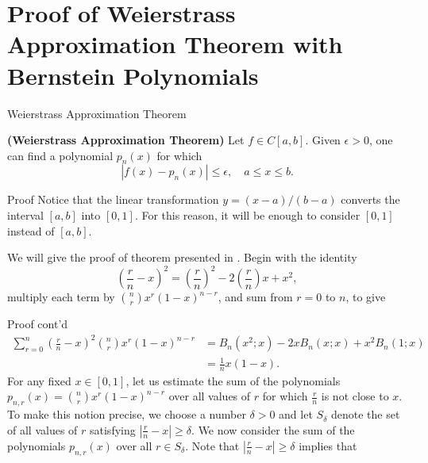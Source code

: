\documentclass{beamer}
\begin{document}
\section{Proof of Weierstrass Approximation Theorem with Bernstein Polynomials}
\begin{frame}{Weierstrass Approximation Theorem}
    \begin{theorem}{\bf (Weierstrass Approximation Theorem)}
    Let $f \in C[a, b]$. Given $\epsilon > 0$, one can find a polynomial $p_n(x)$ for which
\begin{equation}
    |f(x) - p_n(x)| \leq \epsilon, \quad a \leq x \leq b.
    \label{weierstrass}
\end{equation}
\end{theorem}
\end{frame}
\begin{frame}{Proof}
    Notice that the linear transformation $y=(x-a)/(b-a)$ converts the interval $[a,b]$ into $[0,1].$ For this reason, it will be enough to consider $[0,1]$ instead of $[a,b].$

   We will give the proof of theorem presented in \cite{phillips2003interpolation}. Begin with the identity
   \begin{equation*}
       \left(\frac{r}{n}-x\right)^2 = \left(\frac{r}{n}\right)^2 - 2\left(\frac{r}{n}\right)x + x^2,
   \end{equation*}
   multiply each term by $\binom{n}{r}x^r(1-x)^{n-r}$, and sum from $r=0$ to $n$, to give
\end{frame}
\begin{frame}{Proof cont'd}
     \begin{align*}
   \label{eqn2}
       \sum_{r=0}^n\left(\frac{r}{n}-x\right)^2\binom{n}{r}x^r(1-x)^{n-r}&=B_n(x^2;x) - 2xB_n(x;x) + x^2B_n(1;x)\\&=
       \frac{1}{n}x(1-x).
   \end{align*}
   For any fixed $x \in [0, 1]$, let us estimate the sum of the polynomials $p_{n, r}(x) = \binom{n}{r}x^r(1-x)^{n-r}$ over all values of $r$ for which $\frac{r}{n}$ is not close to $x$. To make this notion precise, we choose a number $\delta > 0$ and let $S_{\delta}$ denote the set of all values of $r$ satisfying $|\frac{r}{n}-x| \geq \delta$. We now consider the sum of the polynomials $p_{n, r}(x)$ over all $r \in S_\delta.$ Note that $|\frac{r}{n}-x|\geq\delta$ implies that
\end{frame}
\end{document}
